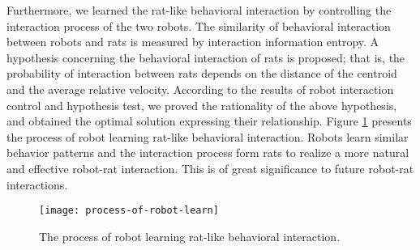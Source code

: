 Furthermore, we learned the rat-like behavioral interaction by controlling the
interaction process of the two robots. The similarity of behavioral interaction
between robots and rats is measured by interaction information entropy. A
hypothesis concerning the behavioral interaction of rats is proposed; that is,
the probability of interaction between rats depends on the distance of the
centroid and the average relative velocity. According to the results of robot
interaction control and hypothesis test, we proved the rationality of the above
hypothesis, and obtained the optimal solution expressing their relationship.
Figure \ref{process-of-robot-learn} presents the process of robot learning
rat-like behavioral interaction. Robots learn similar behavior patterns and the
interaction process form rats to realize a more natural and effective robot-rat
interaction. This is of great significance to future robot-rat interactions.

\begin{figure}[h]
    \centering
    \texttt{[image: process-of-robot-learn]}
    \caption{The process of robot learning rat-like behavioral interaction.}
    \label{process-of-robot-learn}
\end{figure}

